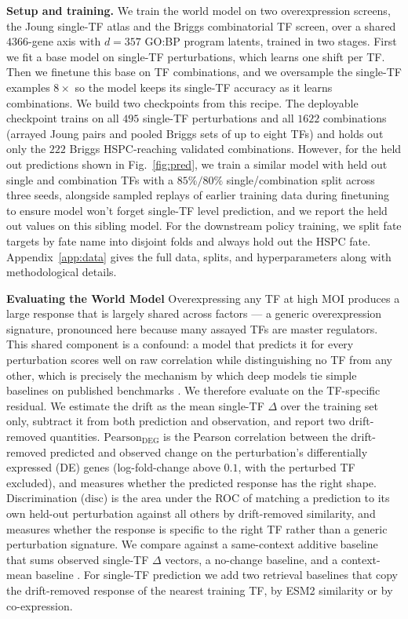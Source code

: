 \documentclass{article}
\begin{document}
\textbf{Setup and training.} We train the world model on two overexpression screens, the Joung single-TF atlas and the Briggs
combinatorial TF screen, over a shared $4366$-gene axis with $d{=}357$ GO:BP program latents, trained in two stages. First we fit a base model on single-TF perturbations, which learns one shift per TF. Then we
finetune this base on TF combinations, and we oversample the single-TF examples $8\times$ so the model keeps
its single-TF accuracy as it learns combinations. We build two checkpoints from this recipe. The deployable
checkpoint trains on all $495$ single-TF perturbations and all $1622$ combinations (arrayed Joung pairs and
pooled Briggs sets of up to eight TFs) and holds out only the $222$ Briggs HSPC-reaching validated combinations. However, for the held out predictions shown in Fig.~\ref{fig:pred}, we train a similar model with held out single and combination TFs with a  $85\%/80\%$ single/combination split across
three seeds, alongside sampled replays of earlier training data during finetuning to ensure model won't forget single-TF level prediction, and we report the held out values on this sibling model. For the downstream policy training, we
split fate targets by fate name into disjoint folds and always hold out the HSPC fate. Appendix~\ref{app:data}
gives the full data, splits, and hyperparameters along with methodological details.



\textbf{Evaluating the World Model} Overexpressing any TF at high MOI produces a large response that is largely shared across factors — a generic overexpression signature, pronounced here because many assayed TFs are master regulators. This shared component is a confound: a model that predicts it for every perturbation scores well on raw correlation while distinguishing no TF from any other, which is precisely the mechanism by which deep models tie simple baselines on published benchmarks  \citep{ahlmanneltze2025}. We therefore evaluate on the TF-specific residual. We estimate the drift as the mean single-TF $\Delta$ over the training set only, subtract it from both prediction and observation, and report two drift-removed quantities. $\mathrm{Pearson}_{\mathrm{DEG}}$ is the Pearson correlation between the drift-removed
predicted and observed change on the perturbation's differentially expressed (DE) genes (log-fold-change
above $0.1$, with the perturbed TF excluded), and measures whether the predicted response has the right
shape. Discrimination ($\mathrm{disc}$) is the area under the ROC of matching a prediction to its own
held-out perturbation against all others by drift-removed similarity, and measures whether the response
is specific to the right TF rather than a generic perturbation signature. We compare against a
same-context additive baseline that sums observed single-TF $\Delta$ vectors, a no-change baseline, and a
context-mean baseline \citep{ahlmanneltze2025}. For single-TF prediction we add two retrieval baselines
that copy the drift-removed response of the nearest training TF, by ESM2 similarity or by co-expression.
\end{document}
